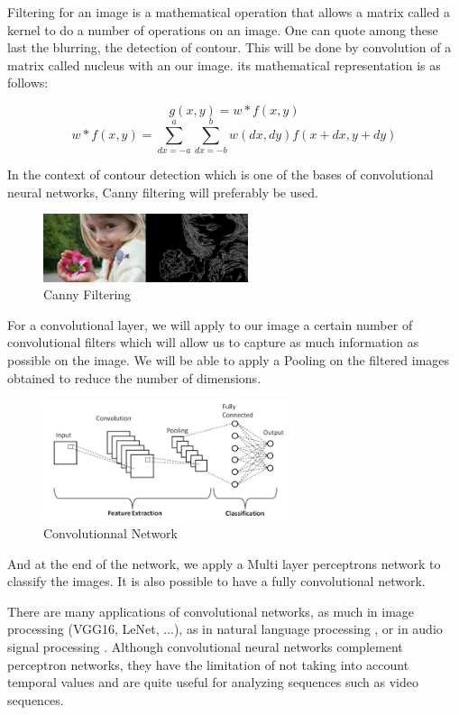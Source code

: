 \documentclass[twoside,twocolumn]{article}
\begin{document}
Filtering for an image is a mathematical operation that allows a matrix called a kernel to do a number of operations on an image. One can 
quote among these last the blurring, the detection of contour. This will be done by convolution of a matrix called nucleus with an our image. 
its mathematical representation is as follows:

\[g(x,y) = w*f(x,y)\]
\[w*f(x,y) = \sum_{dx=-a}^{a} \sum_{dx=-b}^{b} w(dx,dy)f(x+dx,y+dy)\]

In the context of contour detection which is one of the bases of convolutional neural networks, Canny filtering will preferably be used\cite{Canny1}.

\begin{figure}[h]
  \centering
  \includegraphics[width=60mm]{canny.png}
  \caption{Canny Filtering}
  \label{CannyOutput}
  \end{figure}

For a convolutional layer, we will apply to our image a certain number of convolutional filters which will allow us to capture as much information 
as possible on the image. We will be able to apply a Pooling on the filtered images obtained to reduce the number of dimensions.

  \begin{figure}[h]
  \centering
  \includegraphics[width=72mm]{convneural.png}
  \caption{Convolutionnal Network}
  \label{ConvNet}
\end{figure}
And at the end of the network, we apply a Multi layer perceptrons network to classify the images. It is also possible to have a fully convolutional network. 

There are many applications of convolutional networks, as much in image processing \cite{Browne1} (VGG16, LeNet, ...), as in natural language processing 
\cite{8666928}, or in audio signal processing \cite{Gama_2019}. Although convolutional neural networks complement perceptron networks, they have the limitation 
of not taking into account temporal values and are quite useful for analyzing sequences such as video sequences.
\end{document}
